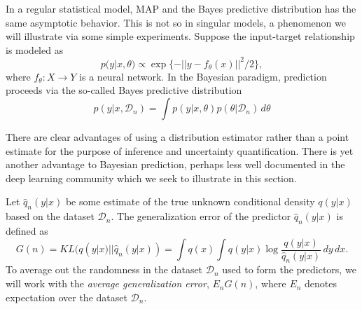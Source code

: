 \documentclass{article} %
\begin{document}
In a regular statistical model, MAP and the Bayes predictive distribution has the same asymptotic behavior. This is not so in singular models, a phenomenon we will illustrate via some simple experiments. Suppose the input-target relationship is modeled as
\begin{equation}
p(y|x,\theta) \propto \exp\{-|| y - f_\theta(x) ||^2/2\},
\label{eq:genexp_model}
\end{equation}
where $f_\theta: X \to Y$ is a neural network.
In the Bayesian paradigm, prediction proceeds via the so-called Bayes predictive distribution
\begin{equation}
p(y|x, \mathcal D_n) = \int p(y|x,\theta) p(\theta|\mathcal D_n) \,d\theta
\label{eq:bayes_pred_dist}
\end{equation}

There are clear advantages of using a distribution estimator rather than a point estimate for the purpose of inference and uncertainty quantification.
There is yet another advantage to Bayesian prediction, perhaps less well documented in the deep learning community which we seek to illustrate in this section. 

Let $\hat q_n(y|x)$ be some estimate of the true unknown conditional density $q(y|x)$ based on the dataset $\mathcal D_n$. The generalization error of the predictor $\hat q_n(y|x)$ is defined as
$$
G(n) = KL (q(y|x) || \hat q_n(y|x) ) = \int q(x) \int q(y|x) \log \frac{q(y|x)}{\hat q_n(y|x)} \,dy  \,dx.
$$
To average out the randomness in the dataset $\mathcal D_n$ used to form the predictors, we will work with the \textit{average generalization error}, $E_n G(n)$, where $E_n$ denotes expectation over the dataset $\mathcal D_n$.
\end{document}
